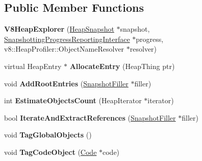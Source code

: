 \subsection*{Public Member Functions}
\begin{DoxyCompactItemize}
\item 
\hypertarget{classv8_1_1internal_1_1_v8_heap_explorer_a380cad4a97cc6608f02640026ef32441}{}{\bfseries V8\+Heap\+Explorer} (\hyperlink{classv8_1_1internal_1_1_heap_snapshot}{Heap\+Snapshot} $\ast$snapshot, \hyperlink{classv8_1_1internal_1_1_snapshotting_progress_reporting_interface}{Snapshotting\+Progress\+Reporting\+Interface} $\ast$progress, v8\+::\+Heap\+Profiler\+::\+Object\+Name\+Resolver $\ast$resolver)\label{classv8_1_1internal_1_1_v8_heap_explorer_a380cad4a97cc6608f02640026ef32441}

\item 
\hypertarget{classv8_1_1internal_1_1_v8_heap_explorer_a074fd0c7b6ef4e664a873d297850c80e}{}virtual Heap\+Entry $\ast$ {\bfseries Allocate\+Entry} (Heap\+Thing ptr)\label{classv8_1_1internal_1_1_v8_heap_explorer_a074fd0c7b6ef4e664a873d297850c80e}

\item 
\hypertarget{classv8_1_1internal_1_1_v8_heap_explorer_a1882a866c08ca2928bf41812b6e80671}{}void {\bfseries Add\+Root\+Entries} (\hyperlink{classv8_1_1internal_1_1_snapshot_filler}{Snapshot\+Filler} $\ast$filler)\label{classv8_1_1internal_1_1_v8_heap_explorer_a1882a866c08ca2928bf41812b6e80671}

\item 
\hypertarget{classv8_1_1internal_1_1_v8_heap_explorer_af4f43686b87f0135ba2db4a384c303f4}{}int {\bfseries Estimate\+Objects\+Count} (Heap\+Iterator $\ast$iterator)\label{classv8_1_1internal_1_1_v8_heap_explorer_af4f43686b87f0135ba2db4a384c303f4}

\item 
\hypertarget{classv8_1_1internal_1_1_v8_heap_explorer_a1cf4b763af4920c92a7195e5222a61c4}{}bool {\bfseries Iterate\+And\+Extract\+References} (\hyperlink{classv8_1_1internal_1_1_snapshot_filler}{Snapshot\+Filler} $\ast$filler)\label{classv8_1_1internal_1_1_v8_heap_explorer_a1cf4b763af4920c92a7195e5222a61c4}

\item 
\hypertarget{classv8_1_1internal_1_1_v8_heap_explorer_a3fc89ba6b31b1f48e4ce026976eeaf79}{}void {\bfseries Tag\+Global\+Objects} ()\label{classv8_1_1internal_1_1_v8_heap_explorer_a3fc89ba6b31b1f48e4ce026976eeaf79}

\item 
\hypertarget{classv8_1_1internal_1_1_v8_heap_explorer_a05f5e92ad08d54b75baaace7509ec2d4}{}void {\bfseries Tag\+Code\+Object} (\hyperlink{classv8_1_1internal_1_1_code}{Code} $\ast$code)\label{classv8_1_1internal_1_1_v8_heap_explorer_a05f5e92ad08d54b75baaace7509ec2d4}


\end{DoxyCompactItemize}

